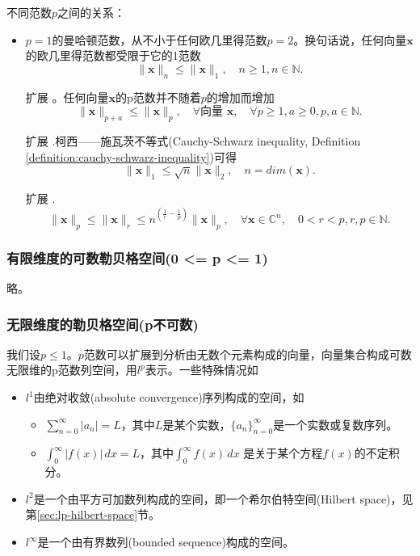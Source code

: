   不同范数$p$之间的关系：
\begin{itemize}
  \item $p=1$的曼哈顿范数，从不小于任何欧几里得范数$p=2$。换句话说，任何向量$\bm{x}$的欧几里得范数都受限于它的1范数
  \begin{equation*}
    \| \bm{x} \|_{n} \le \| \bm{x} \|_1, \quad n \ge 1, n\in \mathbb{N}.
  \end{equation*}
  \item [扩展]。任何向量$\bm{x}$的p范数并不随着$p$的增加而增加
  \begin{equation*}
    \| \bm{x} \|_{p+a} \le \| \bm{x} \|_{p}, \quad \forall \text{向量 } \bm{x}, \quad \forall p \ge 1, a \ge 0, p,a \in \mathbb{N}.
  \end{equation*}
  \item [扩展].柯西——施瓦茨不等式(Cauchy-Schwarz inequality, Definition \ref{definition:cauchy-schwarz-inequality})可得
  \begin{equation*}
  \| \bm{x} \|_{1} \le \sqrt{n} \| \bm{x} \|_{2}, \quad n = dim(\bm{x}).
  \end{equation*}
  \item   [扩展].
    \begin{equation*}
      \| \bm{x} \|_{p} \le \| \bm{x} \|_{r} \le n^{\left(\frac{1}{r} - \frac{1}{p} \right)} \| \bm{x} \|_{p}, \quad \forall \bm{x} \in \mathbb{C}^n, \quad 0 < r <p, r,p \in \mathbb{N}.
    \end{equation*}
\end{itemize}

\subsubsection{有限维度的可数勒贝格空间(0 <= p <= 1)}
略。

\subsubsection{无限维度的勒贝格空间(p不可数)}
我们设$p\le 1$。$p$范数可以扩展到分析由无数个元素构成的向量，向量集合构成可数无限维的p范数列空间，用$l^p$表示。一些特殊情况如
\begin{itemize}
  \item $l^1$由绝对收敛(absolute convergence)序列构成的空间，如
  \begin{itemize}
    \item $\sum_{n=0}^{\infty} \left| a_n \right| = L$，其中$L$是某个实数，$\{a_n\}_{n=0}^{\infty}$是一个实数或复数序列。
    \item $\int_{0}^{\infty} \left| f(x) \right| \, dx = L$，其中$ \int_{0}^{\infty}  f(x)  \, dx$ 是关于某个方程$f(x)$的不定积分。
  \end{itemize}
  \item $l^2$是一个由平方可加数列构成的空间，即一个希尔伯特空间(Hilbert space)，见第\ref{sec:lp-hilbert-space}节。
  \item $l^{\infty}$是一个由有界数列(bounded sequence)构成的空间。
\end{itemize}

